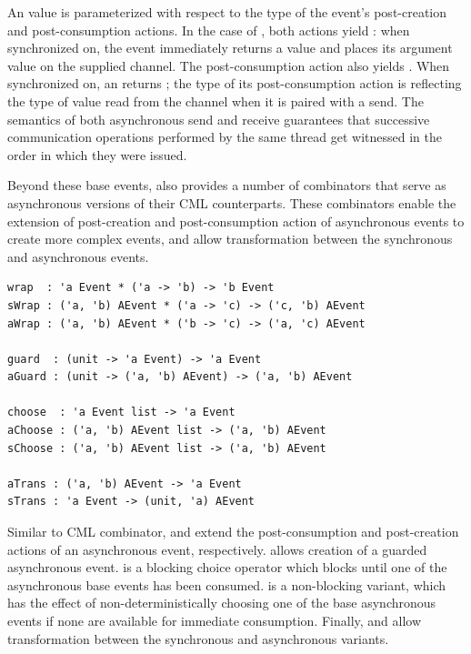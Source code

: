 An  value is parameterized with respect to the type of the event's
post-creation and post-consumption actions.  In the case of , both
actions yield : when synchronized on, the event immediately returns a
 value and places its  argument value on the supplied channel.
The post-consumption action also yields . When synchronized on, an
 returns ; the type of its post-consumption action is
 reflecting the type of value read from the channel when it is paired
with a send. The semantics of both asynchronous send and receive guarantees
that successive communication operations performed by the same thread get
witnessed in the order in which they were issued.

Beyond these base events, \acml also provides a number of combinators that
serve as asynchronous versions of their CML counterparts. These combinators
enable the extension of post-creation and post-consumption action of
asynchronous events to create more complex events, and allow transformation
between the synchronous and asynchronous events.
\vspace{2mm}

\lstset{numbers=none}
\begin{lstlisting}
wrap  : 'a Event * ('a -> 'b) -> 'b Event
sWrap : ('a, 'b) AEvent * ('a -> 'c) -> ('c, 'b) AEvent
aWrap : ('a, 'b) AEvent * ('b -> 'c) -> ('a, 'c) AEvent

guard  : (unit -> 'a Event) -> 'a Event
aGuard : (unit -> ('a, 'b) AEvent) -> ('a, 'b) AEvent

choose  : 'a Event list -> 'a Event
aChoose : ('a, 'b) AEvent list -> ('a, 'b) AEvent
sChoose : ('a, 'b) AEvent list -> ('a, 'b) AEvent

aTrans : ('a, 'b) AEvent -> 'a Event
sTrans : 'a Event -> (unit, 'a) AEvent
\end{lstlisting}

Similar to CML  combinator,  and  extend the
post-consumption and post-creation actions of an asynchronous event,
respectively.  allows creation of a guarded asynchronous event.
 is a blocking choice operator which blocks until one of the
asynchronous base events has been consumed.  is a non-blocking
variant, which has the effect of non-deterministically choosing one of the base
asynchronous events if none are available for immediate consumption. Finally,
 and  allow transformation between the synchronous and
asynchronous variants.
\vspace{5mm}

